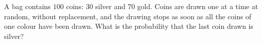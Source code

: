 A bag contains $100$ coins: $30$ silver and $70$ gold. Coins are drawn one at a time at random, without replacement, and the drawing stops as soon as all the coins of one colour have been drawn. What is the probability that the last coin drawn is silver?

